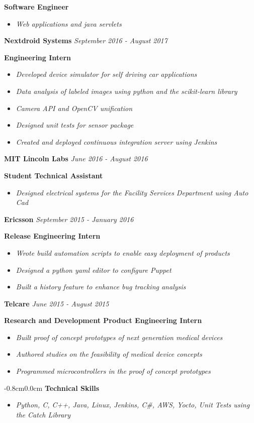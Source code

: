 \documentclass[8pt]{extarticle}
\begin{document}
{\tiny }
\textbf{Software Engineer}
\begin{itemize}
\item \textit{Web applications and java servlets}
\end{itemize}
\textbf{Nextdroid Systems} \hfill\textit{September 2016 - August 2017}

{\tiny }
\textbf{Engineering Intern} 
\begin{itemize}
\item \textit{Developed device simulator for self driving car applications}
\item \textit{Data analysis of labeled images using python and the scikit-learn library}
\item \textit{Camera API and OpenCV unification}
\item \textit{Designed unit tests for sensor package}
\item \textit{Created and deployed continuous integration server using Jenkins}
\end{itemize}
\textbf{MIT Lincoln Labs} \hfill\textit{June  2016 - August 2016}

\textbf{Student Technical Assistant } 
\begin{itemize}
\item \textit{Designed electrical systems for the Facility Services Department using Auto Cad}
\end{itemize}
\textbf{Ericsson} \textit{September  2015 - January 2016}

\textbf{Release Engineering Intern } 
\begin{itemize}
\item \textit{Wrote build automation scripts to enable easy deployment of products}
\item \textit{Designed a python yaml editor to configure Puppet}
\item \textit{Built a history feature to enhance bug tracking analysis}

\end{itemize}
\textbf{Telcare} \hfill\textit{June  2015 - August 2015}

\textbf{Research and Development Product Engineering Intern} 
\begin{itemize}
\item \textit{Built proof of concept prototypes of next generation medical devices}
\item \textit{Authored studies on the feasibility of medical device concepts}
\item \textit{Programmed microcontrollers in the proof of concept prototypes}

\end{itemize}
\begin{changemargin}{-0.8cm}{0.0cm}
	\textbf{Technical Skills}
\end{changemargin}
\vspace*{-0.4cm}
\makebox[\linewidth]{\rule{17cm}{0.4pt}}
\begin{itemize}
\item \textit{Python, C, C++, Java, Linux, Jenkins, C\#, AWS, Yocto, Unit Tests using the Catch Library}
\end{itemize}
\end{document}

